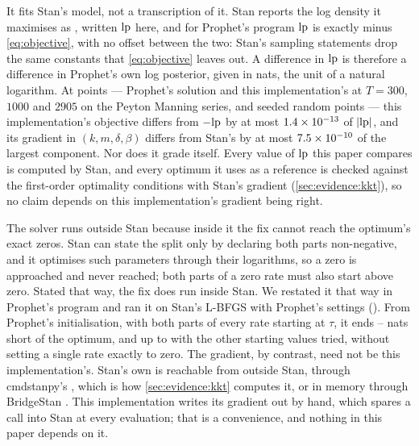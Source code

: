 It fits Stan's model, not a transcription of it. Stan reports the log density it
maximises as , written $\mathrm{lp}$ here, and for Prophet's program $\mathrm{lp}$ is
exactly minus \eqref{eq:objective}, with no offset between the two: Stan's sampling
statements drop the same constants that \eqref{eq:objective} leaves out. A difference
in $\mathrm{lp}$ is therefore a difference in Prophet's own log posterior, given in nats, the
unit of a natural logarithm. At \KktStanPoints{} points --- Prophet's solution and this
implementation's at $T = 300$, $1000$ and $2905$ on the Peyton Manning series, and
seeded random points --- this implementation's objective differs from $-\mathrm{lp}$ by at
most $1.4\times10^{-13}$ of $\lvert\mathrm{lp}\rvert$, and its gradient in
$(k, m, \delta, \beta)$ differs from Stan's by at most $7.5\times10^{-10}$ of
the largest component. Nor does it grade itself. Every value of $\mathrm{lp}$ this paper
compares is computed by Stan, and every optimum it uses as a reference is checked
against the first-order optimality conditions with Stan's gradient
(\cref{sec:evidence:kkt}), so no claim depends on this implementation's gradient
being right.

The solver runs outside Stan because inside it the fix cannot reach the optimum's
exact zeros. Stan can state the split only by declaring both parts non-negative, and it
optimises such parameters through their logarithms, so a zero is approached and never
reached; both parts of a zero rate must also start above zero. Stated that way, the fix
does run inside Stan. We restated it that way in Prophet's program and ran it on Stan's
L-BFGS with Prophet's settings (). From
Prophet's initialisation, with both
parts of every rate starting at $\tau$, it ends
\InsideSplitStartMin--\InsideSplitStartMax{} nats short of the optimum, and up to
\InsideSplitFloorWorst{} with the other starting values tried, without setting a
single rate exactly to zero. The
gradient, by contrast, need not be this implementation's. Stan's own is reachable
from outside Stan, through cmdstanpy's , which is how
\cref{sec:evidence:kkt} computes it, or in memory through BridgeStan
\citep{roualdes2023bridgestan}. This implementation writes its gradient out by hand,
which spares a call into Stan at every evaluation; that is a convenience, and nothing
in this paper depends on it.
